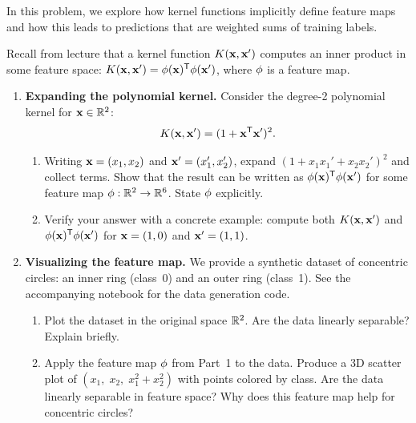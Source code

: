 \documentclass[submit]{../harvardml}
\begin{document}
\begin{problem}

In this problem, we explore how kernel functions implicitly define
feature maps and how this leads to predictions that are weighted sums of
training labels.

Recall from lecture that a kernel function $K(\mathbf{x}, \mathbf{x}')$ computes
an inner product in some feature space: $K(\mathbf{x}, \mathbf{x}') =
\mathbf{\phi}(\mathbf{x})^{\mathsf{T}} \mathbf{\phi}(\mathbf{x}')$, where $\mathbf{\phi}$ is a feature map.

\begin{enumerate}

  \item[1.] \textbf{Expanding the polynomial kernel.}
  Consider the degree-2 polynomial kernel for $\mathbf{x} \in \mathbb{R}^2$:
  \[
    K(\mathbf{x}, \mathbf{x}') = (1 + \mathbf{x}^{\mathsf{T}} \mathbf{x}')^2.
  \]

  \begin{enumerate}
    \item Writing $\mathbf{x} = (x_1, x_2)$ and $\mathbf{x}' = (x_1', x_2')$,
    expand $(1 + x_1 x_1' + x_2 x_2')^2$ and collect terms. Show that the
    result can be written as $\mathbf{\phi}(\mathbf{x})^{\mathsf{T}} \mathbf{\phi}(\mathbf{x}')$ for
    some feature map $\mathbf{\phi} : \mathbb{R}^2 \to \mathbb{R}^6$. State $\mathbf{\phi}$
    explicitly.

    \item Verify your answer with a concrete example: compute both
    $K(\mathbf{x}, \mathbf{x}')$ and $\mathbf{\phi}(\mathbf{x})^{\mathsf{T}} \mathbf{\phi}(\mathbf{x}')$ for
    $\mathbf{x} = (1, 0)$ and $\mathbf{x}' = (1, 1)$.
  \end{enumerate}

  \item[2.] \textbf{Visualizing the feature map.}
  We provide a synthetic dataset of concentric circles: an inner ring
  (class~0) and an outer ring (class~1). See the accompanying notebook
  for the data generation code.

  \begin{enumerate}
    \item Plot the dataset in the original space $\mathbb{R}^2$.
    Are the data linearly separable? Explain briefly.

    \item Apply the feature map $\mathbf{\phi}$ from Part~1 to the data. Produce
    a 3D scatter plot of $(x_1,\; x_2,\; x_1^2 + x_2^2)$ with points
    colored by class. Are the data linearly separable in feature space?
    Why does this feature map help for concentric circles?


\end{enumerate}
\end{enumerate}
\end{problem}
\end{document}
